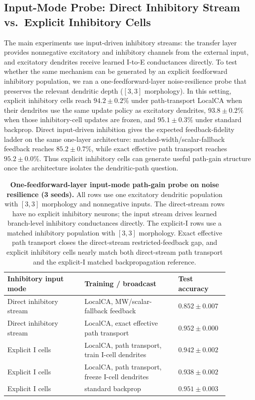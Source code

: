     \subsection{Input-Mode Probe: Direct Inhibitory Stream vs.\ Explicit Inhibitory Cells}
    
    The main experiments use input-driven inhibitory streams: the transfer layer provides nonnegative excitatory and inhibitory channels from the external input, and excitatory dendrites receive learned I-to-E conductances directly. To test whether the same mechanism can be generated by an explicit feedforward inhibitory population, we ran a one-feedforward-layer noise-resilience probe that preserves the relevant dendritic depth ($[3,3]$ morphology). In this setting, explicit inhibitory cells reach $94.2\pm0.2\%$ under path-transport LocalCA when their dendrites use the same update policy as excitatory dendrites, $93.8\pm0.2\%$ when those inhibitory-cell updates are frozen, and $95.1\pm0.3\%$ under standard backprop. Direct input-driven inhibition gives the expected feedback-fidelity ladder on the same one-layer architecture: matched-width/scalar-fallback feedback reaches $85.2\pm0.7\%$, while exact effective path transport reaches $95.2\pm0.0\%$. Thus explicit inhibitory cells can generate useful path-gain structure once the architecture isolates the dendritic-path question.
    
    \begin{table}[!htbp]
    \centering
    \small
    \renewcommand{\arraystretch}{1.02}
    \setlength{\tabcolsep}{5pt}
    \begin{tabular}{@{}L{0.32\linewidth}L{0.39\linewidth}L{0.18\linewidth}@{}}
    \toprule
    \textbf{Inhibitory input mode} & \textbf{Training / broadcast} & \textbf{Test accuracy} \\
    \midrule
    Direct inhibitory stream & LocalCA, MW/scalar-fallback feedback & $0.852 \pm 0.007$ \\
    Direct inhibitory stream & LocalCA, exact effective path transport & $\mathbf{0.952 \pm 0.000}$ \\
    Explicit I cells & LocalCA, path transport, train I-cell dendrites & $0.942 \pm 0.002$ \\
    Explicit I cells & LocalCA, path transport, freeze I-cell dendrites & $0.938 \pm 0.002$ \\
    Explicit I cells & standard backprop & $0.951 \pm 0.003$ \\
    \bottomrule
    \end{tabular}
    \caption{\textbf{One-feedforward-layer input-mode path-gain probe on noise resilience (3 seeds).} All rows use one excitatory dendritic population with $[3,3]$ morphology and nonnegative inputs. The direct-stream rows have no explicit inhibitory neurons; the input stream drives learned branch-level inhibitory conductances directly. The explicit-I rows use a matched inhibitory population with $[3,3]$ morphology. Exact effective path transport closes the direct-stream restricted-feedback gap, and explicit inhibitory cells nearly match both direct-stream path transport and the explicit-I matched backpropagation reference.}
    \label{tab:input_mode_probe}
    \end{table}
    
